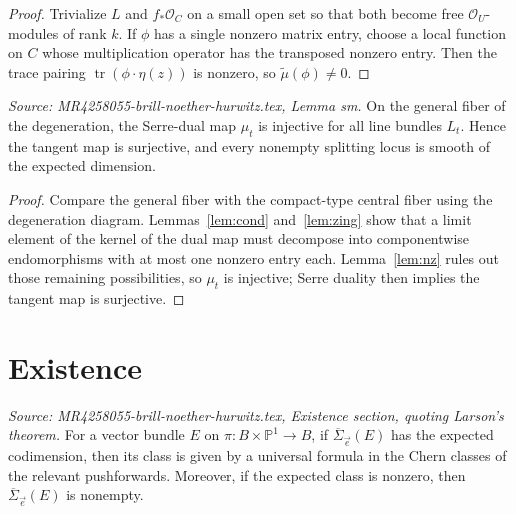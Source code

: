 \begin{proof}
  Trivialize \(L\) and \(f_*\mathcal O_C\) on a small open set so that both become free \(\mathcal O_U\)-modules of rank \(k\). If \(\phi\) has a single nonzero matrix entry, choose a local function on \(C\) whose multiplication operator has the transposed nonzero entry. Then the trace pairing \(\operatorname{tr}(\phi\cdot \eta(z))\) is nonzero, so \(\tilde\mu(\phi)\neq 0\).
\end{proof}

\begin{lemma}[Smoothness]
  \label{lem:sm}
  \textit{Source: MR4258055-brill-noether-hurwitz.tex, Lemma sm.}
  On the general fiber of the degeneration, the Serre-dual map \(\mu_t\) is injective for all line bundles \(L_t\). Hence the tangent map is surjective, and every nonempty splitting locus is smooth of the expected dimension.
\end{lemma}

\begin{proof}
  Compare the general fiber with the compact-type central fiber using the degeneration diagram. Lemmas~\ref{lem:cond} and~\ref{lem:zing} show that a limit element of the kernel of the dual map must decompose into componentwise endomorphisms with at most one nonzero entry each. Lemma~\ref{lem:nz} rules out those remaining possibilities, so \(\mu_t\) is injective; Serre duality then implies the tangent map is surjective.
\end{proof}

\section{Existence}

\begin{theorem}
  \label{thm:mine}
  \textit{Source: MR4258055-brill-noether-hurwitz.tex, Existence section, quoting Larson's theorem.}
  For a vector bundle \(E\) on \(\pi:B\times\mathbb P^1\to B\), if \(\overline{\Sigma}_{\vec e}(E)\) has the expected codimension, then its class is given by a universal formula in the Chern classes of the relevant pushforwards. Moreover, if the expected class is nonzero, then \(\overline{\Sigma}_{\vec e}(E)\) is nonempty.
\end{theorem}

